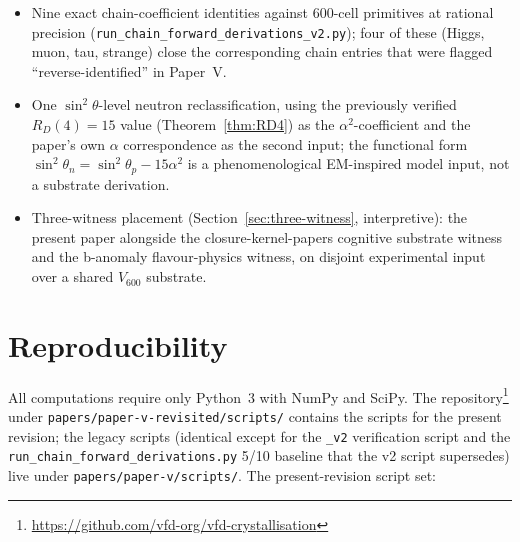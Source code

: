 \documentclass[12pt]{article}
\begin{document}
\begin{itemize}
    \item Nine exact chain-coefficient identities against 600-cell primitives at rational precision (\texttt{run\_chain\_forward\_derivations\_v2.py}); four of these (Higgs, muon, tau, strange) close the corresponding chain entries that were flagged ``reverse-identified'' in Paper~V.
    \item One $\sin^2\theta$-level neutron reclassification, using the previously verified $R_D(4) = 15$ value (Theorem~\ref{thm:RD4}) as the $\alpha^2$-coefficient and the paper's own $\alpha$ correspondence as the second input; the functional form $\sin^2\theta_n = \sin^2\theta_p - 15\alpha^2$ is a phenomenological EM-inspired model input, not a substrate derivation.
    \item Three-witness placement (Section~\ref{sec:three-witness}, interpretive): the present paper alongside the closure-kernel-papers cognitive substrate witness and the b-anomaly flavour-physics witness, on disjoint experimental input over a shared $V_{600}$ substrate.
\end{itemize}

\section{Reproducibility}\label{sec:reproducibility}

All computations require only Python~3 with NumPy and SciPy. The repository\footnote{\url{https://github.com/vfd-org/vfd-crystallisation}} under \texttt{papers/paper-v-revisited/scripts/} contains the scripts for the present revision; the legacy scripts (identical except for the \texttt{\_v2} verification script and the \texttt{run\_chain\_forward\_derivations.py} 5/10 baseline that the v2 script supersedes) live under \texttt{papers/paper-v/scripts/}. The present-revision script set:
\end{document}
